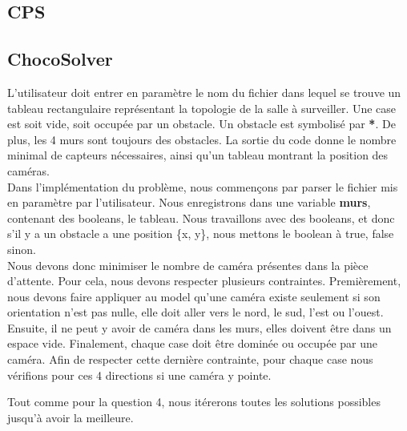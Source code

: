 \documentclass{article}
\begin{document}
\subsection{CPS}

\subsection{ChocoSolver}
L'utilisateur doit entrer en paramètre le nom du fichier dans lequel se trouve un tableau rectangulaire représentant la topologie de la salle à surveiller. 
Une case est soit vide, soit occupée par un obstacle. Un obstacle est symbolisé par \textbf{*}. De plus, les 4 murs sont toujours des obstacles. 
La sortie du code donne le nombre minimal de capteurs nécessaires, ainsi qu'un tableau montrant la position des caméras. \\

Dans l'implémentation du problème, nous commençons par parser le fichier mis en paramètre par l'utilisateur. Nous enregistrons dans une variable \textbf{murs}, contenant des booleans, le tableau. Nous travaillons avec des booleans, et donc s'il y a un obstacle a une position \{x, y\}, nous mettons le boolean à true, false sinon.\\

Nous devons donc minimiser le nombre de caméra présentes dans la pièce d'attente. Pour cela, nous devons respecter plusieurs contraintes. Premièrement, nous devons faire appliquer au model qu'une caméra existe seulement si son orientation n'est pas nulle, elle doit aller vers le nord, le sud, l'est ou l'ouest. Ensuite, il ne peut y avoir de caméra dans les murs, elles doivent être dans un espace vide. Finalement, chaque case doit être dominée ou occupée par une caméra. Afin de respecter cette dernière contrainte, pour chaque case nous vérifions pour ces 4 directions si une caméra y pointe.

Tout comme pour la question 4, nous itérerons toutes les solutions possibles jusqu'à avoir la meilleure.
\end{document}
